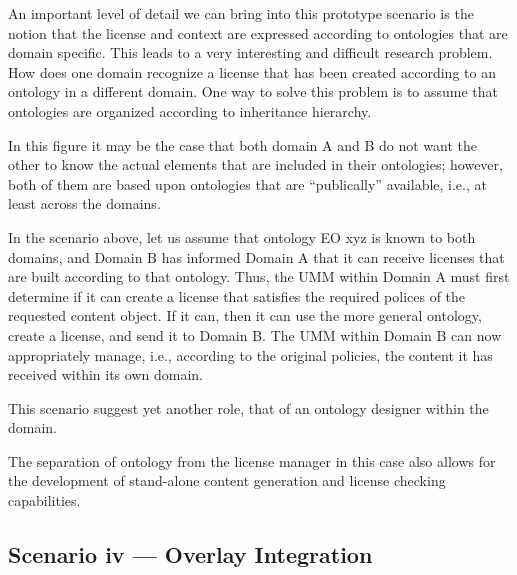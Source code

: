 An important level of detail we can bring into this prototype scenario is the notion that the license and context are expressed according to ontologies that are domain specific. This leads to a very interesting and difficult research problem. How does one domain recognize a license that has been created according to an ontology in a different domain. One way to solve this problem is to assume that ontologies are organized according to inheritance hierarchy.

In this figure it may be the case that both domain A and B do not want the other to know the actual elements that are included in their ontologies; however, both of them are based upon ontologies that are “publically” available, i.e., at least across the domains.

In the scenario above, let us assume that ontology EO xyz is known to both domains, and Domain B has informed Domain A that it can receive licenses that are built according to that ontology. Thus, the UMM within Domain A must first determine if it can create a license that satisfies the required polices of the requested content object. If it can, then it can use the more general ontology, create a license, and send it to Domain B. The UMM within Domain B can now appropriately manage, i.e., according to the original policies, the content it has received within its own domain.

This scenario suggest yet another role, that of an ontology designer within the domain.

The separation of ontology from the license manager in this case also allows for the development of stand-alone content generation and license checking capabilities.

\subsection{Scenario iv --- Overlay Integration}
